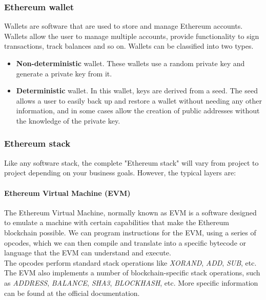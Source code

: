 \documentclass[a4paper, 12pt]{article} %
\begin{document}
        \subsubsection{Ethereum wallet}
            Wallets are software that are used to store and manage Ethereum accounts. Wallets allow the user to manage multiple accounts, provide functionality to sign transactions, track balances and so on. Wallets can be classified into two types.
            \begin{itemize}
                \item \textbf{Non-deterministic} wallet. These wallets use a random private key and generate a private key from it.
                \item \textbf{Deterministic} wallet. In this wallet, keys are derived from a seed. The seed allows a user to easily back up and restore a wallet without needing any other information, and in some cases allow the creation of public addresses without the knowledge of the private key.
            \end{itemize}
        
        \subsubsection{Ethereum stack}
            Like any software stack, the complete "Ethereum stack"\cite{ethereumStack} will vary from project to project depending on your business goals. However, the typical layers are:
            \paragraph{Ethereum Virtual Machine (EVM)}
                The Ethereum Virtual Machine\cite{evm}, normally known as EVM is a software designed to emulate a machine with certain capabilities that make the Ethereum blockchain possible. We can program instructions for the EVM, using a series of opcodes, which we can then compile and translate into a specific bytecode or language that the EVM can understand and execute.\\
                
                The opcodes perform standard stack operations like \textit{XORAND}, \textit{ADD}, \textit{SUB}, etc. The EVM also implements a number of blockchain-specific stack operations, such as \textit{ADDRESS}, \textit{BALANCE}, \textit{SHA3}, \textit{BLOCKHASH}, etc. More specific information can be found at the official documentation\cite{opcodes}.\\
                
\end{document}
